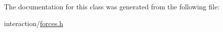 The documentation for this class was generated from the following file\+:\begin{DoxyCompactItemize}
\item 
interaction/\mbox{\hyperlink{forces_8h}{forces.\+h}}\end{DoxyCompactItemize}
